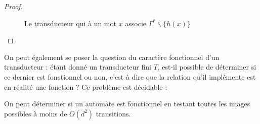 \documentclass{scrartcl}
\begin{document}
\begin{flushleft}
\begin{proof}
\begin{figure}[h] 
    \caption{Le transducteur qui à un mot $x$ associe $\Gamma^* \backslash \{h(x)\}$} \label{autoG-h}
    \begin{center}
    \end{center}
\end{figure}
\end{proof}

On peut également se poser la question du caractère fonctionnel d'un transducteur : étant donné un transducteur fini $T$, est-il possible de déterminer
si ce dernier est fonctionnel ou non, c'est à dire que la relation qu'il implémente est en réalité une fonction ? Ce problème est décidable
\cite{sakarovitch}  :
\begin{theorem}
    On peut déterminer si un automate est fonctionnel en testant toutes les images possibles à moins de $O(d^2)$ transitions.
\end{theorem}


\end{flushleft}
\end{document}
